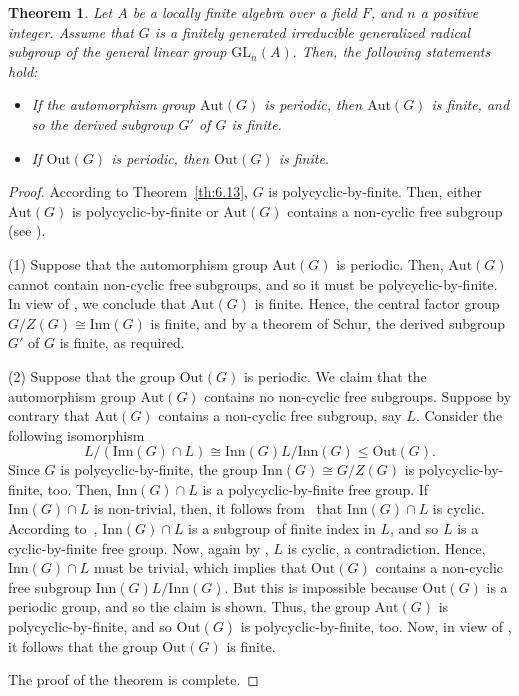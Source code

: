 \documentclass{amsart}
\newtheorem{theorem}{Theorem}[section]
\theoremstyle{definition}
\begin{document}
\begin{theorem}\label{th:6.14} Let $A$ be a locally finite algebra over a field $F$, and $n$ a positive integer. Assume that $G$ is a finitely generated irreducible generalized radical subgroup of the general linear group $\mathrm{GL}_n(A).$ Then, the following statements hold:
	\begin{itemize}
		\item [(1)] If the automorphism group $\mathrm{Aut}(G)$ is periodic, then $\mathrm{Aut}(G)$ is finite, and so the derived subgroup $G'$ of $G$ is finite.
		\item [(2)] If $\mathrm{Out}(G)$ is periodic, then $\mathrm{Out}(G)$ is finite.
	\end{itemize}
\end{theorem}
\begin{proof} According to Theorem~\ref{th:6.13}, $G$ is polycyclic-by-finite. Then, either $\mathrm{Aut}(G)$ is polycyclic-by-finite or $\mathrm{Aut}(G)$ contains a non-cyclic free subgroup (see \cite{Pa_Eick_2003}). 
	
	(1) Suppose that the automorphism group 
	$\mathrm{Aut}(G)$ is periodic. Then, $\mathrm{Aut}(G)$ cannot contain non-cyclic free subgroups, and so it must be polycyclic-by-finite. In view of 	\cite[Lemma 6]{Zassenhaus_1969}, we conclude that $\mathrm{Aut}(G)$ is finite. Hence, the central factor group $G/Z(G)\cong \mathrm{Inn}(G)$ is finite, and by a theorem of Schur, the derived subgroup $G'$ of $G$ is finite, as required.
	
	(2) Suppose that the group $\mathrm{Out}(G)$ is periodic. We claim that the automorphism group $\mathrm{Aut}(G)$ contains no non-cyclic free subgroups. Suppose by contrary that $\mathrm{Aut}(G)$ contains a non-cyclic free subgroup, say $L$. Consider the following isomorphism
	$$L/(\mathrm{Inn}(G)\cap L)\cong \mathrm{Inn}(G)L/\mathrm{Inn}(G)\leq \mathrm{Out}(G).$$
	Since $G$ is polycyclic-by-finite, the group $\mathrm{Inn}(G)\cong G/Z(G)$ is polycyclic-by-finite, too. Then, $\mathrm{Inn}(G)\cap L$ is a polycyclic-by-finite free group. If $\mathrm{Inn}(G)\cap L$ is non-trivial, then, it follows from~\cite[Theorem 2.4]{Pa_ChuaHai_2026} that $\mathrm{Inn}(G)\cap L$ is cyclic. According to~\cite[Ch.1, Proposition~ 3.12]{Bo_LyPa_2001}, $\mathrm{Inn}(G)\cap L$ is a subgroup of finite index in $L$, and so $L$ is a cyclic-by-finite free group. Now, again by \cite[Theorem 2.4]{Pa_ChuaHai_2026}, $L$ is cyclic, a contradiction. Hence, $\mathrm{Inn}(G)\cap L$ must be trivial, which implies that $\mathrm{Out}(G)$ contains a non-cyclic free subgroup $\mathrm{Inn}(G)L/\mathrm{Inn}(G).$ But this is impossible because $\mathrm{Out}(G)$ is a periodic group, and so the claim is shown. Thus, the group $\mathrm{Aut}(G)$ is polycyclic-by-finite, and so $\mathrm{Out}(G)$ is polycyclic-by-finite, too. Now, in view of \cite[Lemma 6]{Zassenhaus_1969}, it follows that the group $\mathrm{Out}(G)$ is finite.
	
	The proof of the theorem is complete.
\end{proof}
\end{document}
